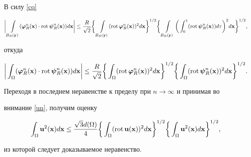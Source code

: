 \begin{pf}
В силу \eqref{cq}


$$


\bigg|\int\limits_{B_R(\bold{y})}(\boldsymbol{\varphi}_R^n(\bold{x})\cdot\Rot


\boldsymbol{\psi}_R^n(\bold{x}))d\bold{x}\bigg|\leq


\frac{R}{\sqrt{2}}\bigg\{\int\limits_


{B_R(\bold{y})}(\Rot\boldsymbol


{\varphi}_R^n(\bold{x}))^2d\bold{x}\bigg\}^{1/2}\bigg\{\int\limits_{B_R


(\bold{y})}\bigg(\int_0^1 (


\Rot\boldsymbol{\psi}_R^n(\bold{x}))d\tau\bigg)^2d\bold{x}\bigg\}^{1/2},


$$


откуда


$$


\bigg|\int_{\Omega}(\boldsymbol{\varphi}_R^n(\bold{x})\cdot\Rot


\boldsymbol{\psi}_R^n(\bold{x}))d\bold{x}\bigg|\leq\frac{R}{\sqrt{2}}\bigg\{\int_


{\Omega}(\Rot\boldsymbol


{\varphi}_R^n(\bold{x}))^2d\bold{x}\bigg\}^{1/2}\bigg


\{\int_{\Omega}


(\Rot\boldsymbol{\psi}_R^n(\bold{x}))^2d\bold{x}\bigg\}^{1/2}.


$$





Переходя в последнем неравенстве к пределу при $n\to\infty$ и принимая во


внимание \ref{un}, получим оценку


$$


\int_{\Omega}\bold{u}^2(\bold{x})d\bold{x}\leq\frac{\sqrt{3}


d(\Omega)}{4}\bigg\{\int_{\Omega}(\Rot\bold{u}(\bold{x}))^


2d\bold{x}\bigg\}^{1/2}\bigg\{\int _{\Omega}


\bold{u}^2(\bold{x})d\bold{x}\bigg\}^{1/2},


$$


из которой следует доказываемое неравенство.


\end{pf}








